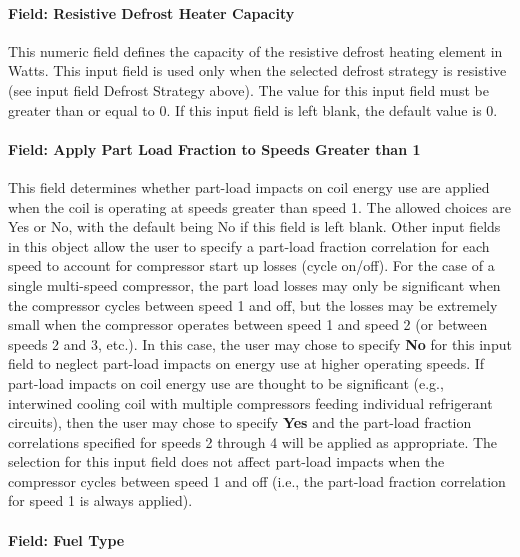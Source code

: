 \paragraph{Field: Resistive Defrost Heater Capacity}\label{field-resistive-defrost-heater-capacity-1}

This numeric field defines the capacity of the resistive defrost heating element in Watts. This input field is used only when the selected defrost strategy is resistive (see input field Defrost Strategy above). The value for this input field must be greater than or equal to 0. If this input field is left blank, the default value is 0.

\paragraph{Field: Apply Part Load Fraction to Speeds Greater than 1}\label{field-apply-part-load-fraction-to-speeds-greater-than-1-1}

This field determines whether part-load impacts on coil energy use are applied when the coil is operating at speeds greater than speed 1. The allowed choices are Yes or No, with the default being No if this field is left blank. Other input fields in this object allow the user to specify a part-load fraction correlation for each speed to account for compressor start up losses (cycle on/off). For the case of a single multi-speed compressor, the part load losses may only be significant when the compressor cycles between speed 1 and off, but the losses may be extremely small when the compressor operates between speed 1 and speed 2 (or between speeds 2 and 3, etc.). In this case, the user may chose to specify \textbf{No} for this input field to neglect part-load impacts on energy use at higher operating speeds. If part-load impacts on coil energy use are thought to be significant (e.g., interwined cooling coil with multiple compressors feeding individual refrigerant circuits), then the user may chose to specify \textbf{Yes} and the part-load fraction correlations specified for speeds 2 through 4 will be applied as appropriate. The selection for this input field does not affect part-load impacts when the compressor cycles between speed 1 and off (i.e., the part-load fraction correlation for speed 1 is always applied).

\paragraph{Field: Fuel Type}\label{field-fuel-type-1-000}


